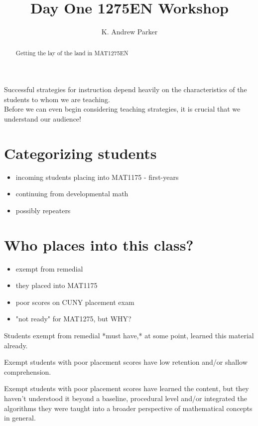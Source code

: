 \documentclass{ximera}
\title{Day One 1275EN Workshop}
\author{K. Andrew Parker}
\begin{document}
\begin{abstract}
Getting the lay of the land in MAT1275EN
\end{abstract}

\maketitle

Successful strategies for instruction depend heavily on the characteristics of the students to whom we are teaching.\\

Before we can even begin considering teaching strategies, it is crucial that we understand our audience! \\


\section{Categorizing students}

\begin{itemize}
\item incoming students placing into MAT1175 - first-years
\item continuing from developmental math
\item possibly repeaters
\end{itemize}

\section{Who places into this class?}

\begin{itemize}
\item exempt from remedial
\item they placed into MAT1175
\item poor scores on CUNY placement exam
\item "not ready" for MAT1275, but WHY?
\end{itemize}

\begin{lemma}
Students exempt from remedial *must have,* at some point, learned this material already.
\end{lemma}

\begin{lemma}
Exempt students with poor placement scores have low retention and/or shallow comprehension.
\end{lemma}

\begin{theorem}
Exempt students with poor placement scores have learned the content, 
but they haven't understood it beyond a baseline, procedural level 
and/or integrated the algorithms they were taught into a broader perspective 
of mathematical concepts in general.
\end{theorem}
\end{document}
